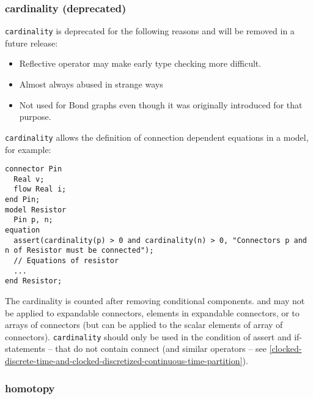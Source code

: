 \subsubsection{cardinality (deprecated)}

\begin{nonnormative}
\lstinline!cardinality! is deprecated for the following reasons and will be removed in a future release:
\begin{itemize}
\item
  Reflective operator may make early type checking more difficult.
\item
  Almost always abused in strange ways
\item
  Not used for Bond graphs even though it was originally introduced for that purpose.
\end{itemize}
\end{nonnormative}

\begin{nonnormative}
\lstinline!cardinality! allows the definition of connection dependent equations in a model, for example:
\begin{lstlisting}[language=modelica]
connector Pin
  Real v;
  flow Real i;
end Pin;
model Resistor
  Pin p, n;
equation
  assert(cardinality(p) > 0 and cardinality(n) > 0, "Connectors p and n of Resistor must be connected");
  // Equations of resistor
  ...
end Resistor;
\end{lstlisting}
\end{nonnormative}

The cardinality is counted after removing conditional components. and
may not be applied to expandable connectors, elements in expandable
connectors, or to arrays of connectors (but can be applied to the scalar
elements of array of connectors). \lstinline!cardinality! should only
be used in the condition of assert and if-statements -- that do not
contain connect (and similar operators -- see \autoref{clocked-discrete-time-and-clocked-discretized-continuous-time-partition}).

\subsubsection{homotopy}

